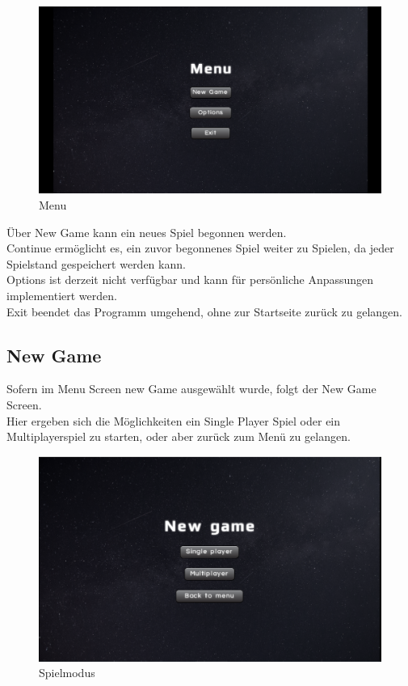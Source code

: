 \documentclass[fontsize=12pt,paper=a4,twoside]{scrartcl}
\begin{document}
\begin{figure}[htp]
	\centering
	\includegraphics[width=1.00\linewidth]{pics/menuscreen.png}
	\caption{Menu}
	\label{fig1}

\end{figure}

Über New Game kann ein neues Spiel begonnen werden. \\
Continue ermöglicht es, ein zuvor begonnenes Spiel weiter zu Spielen, da jeder Spielstand gespeichert werden kann.\\
Options ist derzeit nicht verfügbar und kann für persönliche Anpassungen implementiert werden. \\
Exit beendet das Programm umgehend, ohne zur Startseite zurück zu gelangen.\\

\subsection{New Game}

Sofern im Menu Screen new Game ausgewählt wurde, folgt der New Game Screen.\\
Hier ergeben sich die Möglichkeiten ein Single Player Spiel oder ein Multiplayerspiel zu starten, oder aber zurück zum Menü zu gelangen.\\

\begin{figure}[htp]
	\centering
	\includegraphics[width=1.00\linewidth]{pics/gamemodescreen.png}
	\caption{Spielmodus}
\end{figure}
\end{document}
